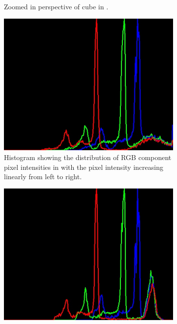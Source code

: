 \begin{figure}[H]
\begin{subfigure}[b]{0.3\textwidth}
         \caption{Zoomed in perspective of cube in .}
         \label{fig:blue-cube-close-image}
    \end{subfigure}
    \begin{subfigure}[b]{0.4\textwidth}
        \includegraphics[width=\textwidth]{figures/202105/blue-cube-close-hist.jpg}
        \caption{Histogram showing the distribution of RGB component pixel intensities in  with the pixel intensity increasing linearly from left to right.}
        \label{fig:blue-cube-close-hist}
    \end{subfigure}
    \begin{subfigure}[b]{0.4\textwidth}
        \includegraphics[width=\textwidth]{figures/202105/blue-cube-close-hist-blur.jpg}

\end{subfigure}
\end{figure}
